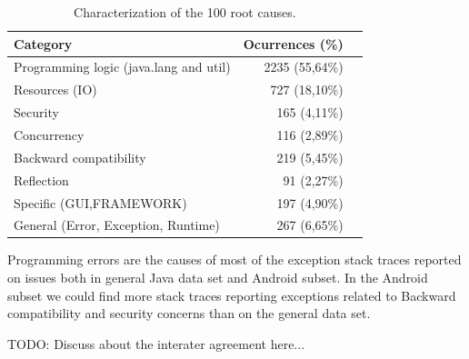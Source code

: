 \documentclass[conference]{IEEEtran}
\begin{document}
\begin{table}
  \centering
  \begin{tabular}{lrr}
    \hline
    \bfseries{Category} &  \bfseries{ Ocurrences (\%)} \\
    \hline
      Programming logic (java.lang and util) & 2235 (55,64\%)\\
      Resources (IO)                         &  727 (18,10\%) \\
      Security                               &  165 (4,11\%)\\
      Concurrency                            & 116  (2,89\%)\\
      Backward compatibility                 &  219 (5,45\%) \\
      Reflection                             &  91 (2,27\%)\\
      Specific (GUI,FRAMEWORK)               &  197 (4,90\%)\\
      General (Error, Exception, Runtime)    &  267 (6,65\%)\\
    \hline
  \end{tabular}
  \caption{Characterization of the 100 root causes.}
  \label{tab:tophundrend}
\end{table}

Programming errors are the causes of most of the exception stack traces reported
on issues both in  general Java data set and Android subset. In the Android subset we could find 
more stack traces reporting exceptions related to Backward
compatibility and security concerns than on the general data set.


TODO: Discuss about the interater agreement here...

\end{document}

